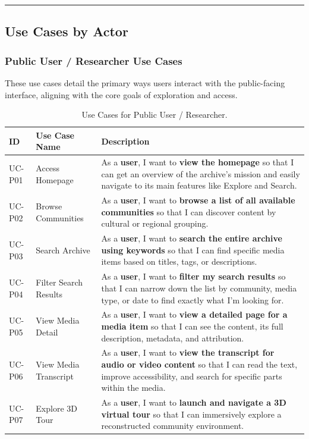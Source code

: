 \hrule

\subsection{Use Cases by Actor}

\subsubsection{Public User / Researcher Use Cases}
These use cases detail the primary ways users interact with the public-facing interface, aligning with the core goals of exploration and access.

\begin{table}[H]
    \centering
    \small
    \begin{tabular}{p{1.5cm} p{4.0cm} p{8.5cm}}
    \hline
    \textbf{ID} & \textbf{Use Case Name} & \textbf{Description} \\
    \hline
    UC-P01 & Access Homepage & As a \textbf{user}, I want to \textbf{view the homepage} so that I can get an overview of the archive's mission and easily navigate to its main features like Explore and Search. \\
    UC-P02 & Browse Communities & As a \textbf{user}, I want to \textbf{browse a list of all available communities} so that I can discover content by cultural or regional grouping. \\
    UC-P03 & Search Archive & As a \textbf{user}, I want to \textbf{search the entire archive using keywords} so that I can find specific media items based on titles, tags, or descriptions. \\
    UC-P04 & Filter Search Results & As a \textbf{user}, I want to \textbf{filter my search results} so that I can narrow down the list by community, media type, or date to find exactly what I'm looking for. \\
    UC-P05 & View Media Detail & As a \textbf{user}, I want to \textbf{view a detailed page for a media item} so that I can see the content, its full description, metadata, and attribution. \\
    UC-P06 & View Media Transcript & As a \textbf{user}, I want to \textbf{view the transcript for audio or video content} so that I can read the text, improve accessibility, and search for specific parts within the media. \\
    UC-P07 & Explore 3D Tour & As a \textbf{user}, I want to \textbf{launch and navigate a 3D virtual tour} so that I can immersively explore a reconstructed community environment. \\
    \hline
    \end{tabular}
    \caption{Use Cases for Public User / Researcher.}
\end{table}

